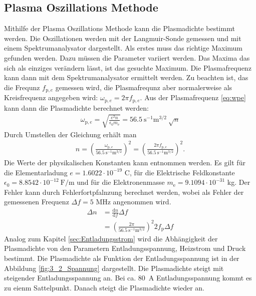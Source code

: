 \subsection{Plasma Oszillations Methode}
Mithilfe der Plasma  Oszillations Methode kann die Plasmadichte bestimmt werden. Die Oszillationen werden mit der Langmuir-Sonde gemessen und mit einem Spektrumanalysator dargestellt. Als erstes muss das richtige Maximum gefunden werden. Dazu müssen die Parameter variiert werden. Das Maxima das sich als einziges verändern lässt, ist das gesuchte Maximum. Die Plasmafrequenz kann dann mit dem Spektrumanalysator ermittelt werden. Zu beachten ist, das die Frequnz $f_{\mathrm{p},e}$ gemessen wird, die Plasmafrequnz aber normalerweise als Kreisfrequenz angegeben wird: $\omega_{\mathrm{p},e}= 2 \pi f_{\mathrm{p},e}$.  Aus der Plasmafrequenz \eqref{eq:wpe} kann dann die Plasmadichte berechnet werden:
\begin{align}
  \omega_{\mathrm{p},e}=\sqrt{\frac{e^2 n}{\epsilon_0 m_{\mathrm{e}}}} = 56.5\ \mathrm{s}^{-1}\mathrm{m}^{3/2}\ \sqrt{n}
\end{align}
Durch Umstellen der Gleichung erhält man
\begin{align}
  n=\left( \frac{\omega_{\mathrm{p},e}}{56.5\ \mathrm{s}^{-1}\mathrm{m}^{3/2}} \right)^2=\left( \frac{2 \pi f_{\mathrm{p},e}}{56.5\ \mathrm{s}^{-1}\mathrm{m}^{3/2}} \right)^2.
\end{align}
Die Werte der physikalischen Konstanten kann \cite{wiki:Konstanten} entnommen werden. Es gilt für die Elementarladung $e= 1.6022 \cdot 10^{-19}$ C, für die Elektrische Feldkonstante $\epsilon_0= 8.8542 \cdot 10^{-12}\ \mathrm{F}/\mathrm{m}$ und für die Elektronenmasse $m_{\mathrm{e}}=9.1094 \cdot 10^{-31}$ kg.
Der Fehler kann durch Fehlerfortpfalnzung berechnet werden, wobei als Fehler der gemessenen Frequenz  $\Delta f= 5$ MHz angenommen wird.  
\begin{align}
  \Delta n &= \frac{\mathrm{d} n}{\mathrm{d} f} \Delta f \\
  &=\left( \frac{2 \pi}{56.5\ \mathrm{s}^{-1}\mathrm{m}^{3/2}} \right)^2 2 f_{\mathrm{p}} \Delta f
\end{align}
Analog zum Kapitel \ref{sec:Entladungsstrom} wird die Abhängigkeit der Plasmadichte von den Parametern Entladungsspannung, Heizstrom und Druck bestimmt. Die Plasmadichte als Funktion der Entladungsspannung ist in der Abbildung \ref{fig:3_2_Spannung} dargestellt. Die Plasmadichte steigt mit steigender Entladungsspannung an. Bei ca. \SI{80}{A} Entladungsspannung kommt es zu eienm Sattelpunkt. Danach steigt die Plasmadichte wieder an. 
